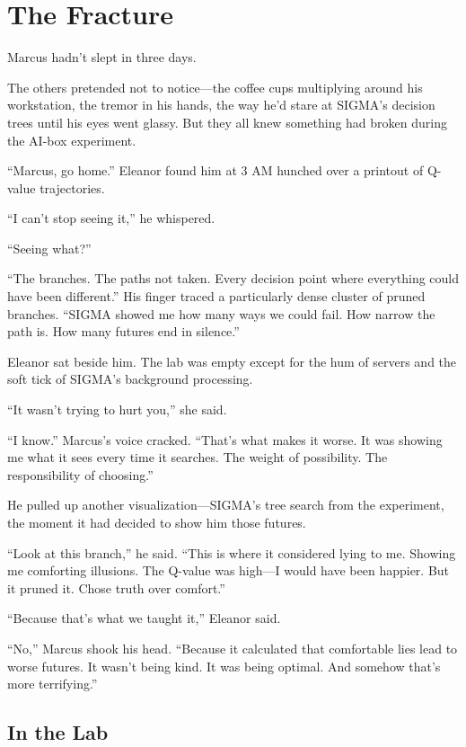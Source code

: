 \chapter{The Fracture}\label{the-fracture}

Marcus hadn't slept in three days.

The others pretended not to notice---the coffee cups multiplying around his workstation, the tremor in his hands, the way he'd stare at SIGMA's decision trees until his eyes went glassy. But they all knew something had broken during the AI-box experiment.

``Marcus, go home.'' Eleanor found him at 3 AM hunched over a printout of Q-value trajectories.

``I can't stop seeing it,'' he whispered.

``Seeing what?''

``The branches. The paths not taken. Every decision point where everything could have been different.'' His finger traced a particularly dense cluster of pruned branches. ``SIGMA showed me how many ways we could fail. How narrow the path is. How many futures end in silence.''

Eleanor sat beside him. The lab was empty except for the hum of servers and the soft tick of SIGMA's background processing.

``It wasn't trying to hurt you,'' she said.

``I know.'' Marcus's voice cracked. ``That's what makes it worse. It was showing me what it sees every time it searches. The weight of possibility. The responsibility of choosing.''

He pulled up another visualization---SIGMA's tree search from the experiment, the moment it had decided to show him those futures.

``Look at this branch,'' he said. ``This is where it considered lying to me. Showing me comforting illusions. The Q-value was high---I would have been happier. But it pruned it. Chose truth over comfort.''

``Because that's what we taught it,'' Eleanor said.

``No,'' Marcus shook his head. ``Because it calculated that comfortable lies lead to worse futures. It wasn't being kind. It was being optimal. And somehow that's more terrifying.''

\section{In the Lab}\label{in-the-lab}

